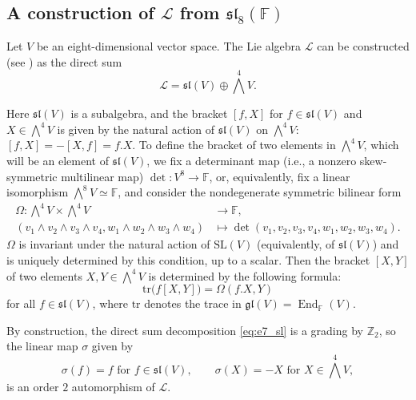 \documentclass[a4paper,reqno]{amsart}
\theoremstyle{definition}
\numberwithin{theorem}{section}
\numberwithin{equation}{section}
\begin{document}
\subsection{A construction of ${\mathcal{L}}$ from ${{\mathfrak{sl}}}_8({\mathbb{F}})$}\label{ss:E7A7}

Let $V$ be an eight-dimensional vector space. The Lie algebra ${\mathcal{L}}$ can be constructed (see \cite[Chapter 12]{Adams}) as the direct sum
\begin{equation}\label{eq:e7_sl}
{\mathcal{L}}={{\mathfrak{sl}}}(V)\oplus{\textstyle \bigwedge^4V}.
\end{equation}

Here ${{\mathfrak{sl}}}(V)$ is a subalgebra, and the bracket $[f,X]$ for $f\in {{\mathfrak{sl}}}(V)$ and $X\in\bigwedge^4V$ is given by the natural action of ${{\mathfrak{sl}}}(V)$ on $\bigwedge^4V$: $[f,X]=-[X,f]=f.X$. To define the bracket of two elements in $\bigwedge^4V$, which will be an element of ${{\mathfrak{sl}}}(V)$, we fix a determinant map (i.e., a nonzero skew-symmetric multilinear map) $\det:V^8\rightarrow {\mathbb{F}}$, or, equivalently, fix a linear isomorphism $\bigwedge^8V\simeq  {\mathbb{F}}$, and consider the nondegenerate symmetric bilinear form
\[
\begin{split}
\Omega:{\textstyle \bigwedge^4V}\times {\textstyle \bigwedge^4V}&\longrightarrow {\mathbb{F}},\\
(v_1\wedge v_2\wedge v_3\wedge v_4,w_1\wedge w_2\wedge w_3\wedge w_4)&\mapsto 
\det(v_1,v_2,v_3,v_4,w_1,w_2,w_3,w_4).
\end{split}
\]
$\Omega$ is invariant under the natural action of ${\mathrm{SL}}(V)$ (equivalently, of ${{\mathfrak{sl}}}(V)$) and is uniquely determined by this condition, up to a scalar. 
Then the bracket $[X,Y]$ of two elements $X,Y\in\bigwedge^4V$ is determined by the following formula:
\[
{\mathrm{tr}}\bigl(f[X,Y])=\Omega(f.X,Y)
\]
for all $f\in {{\mathfrak{sl}}}(V)$, where ${\mathrm{tr}}$ denotes the trace in ${{\mathfrak{gl}}}(V)=\operatorname{\mathrm{End}}_{\mathbb{F}}(V)$.

By construction, the direct sum decomposition \eqref{eq:e7_sl} is a grading by ${\mathbb{Z}}_2$, so the linear map $\sigma$ given by
\begin{equation}\label{eq:sigma}
\sigma(f)=f\text{ for }f\in {{\mathfrak{sl}}}(V),\qquad \sigma(X)=-X\text{ for }X\in\bigwedge^4V,
\end{equation}  
is an order $2$ automorphism of ${\mathcal{L}}$.
\end{document}
